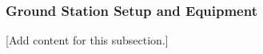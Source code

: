 
\subsubsection{Ground Station Setup and Equipment}
\label{subsubsec:design_2_8_1_ground_station_setup_equipment}

[Add content for this subsection.]
